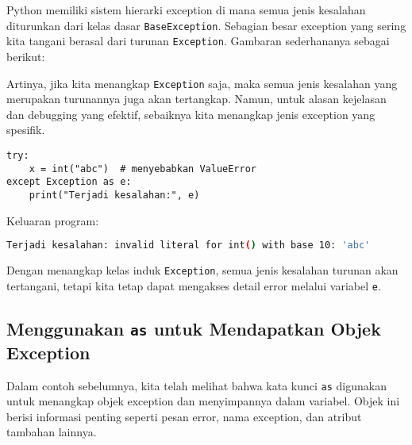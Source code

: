 Python memiliki sistem hierarki exception di mana semua jenis kesalahan diturunkan dari kelas dasar \texttt{BaseException}. Sebagian besar exception yang sering kita tangani berasal dari turunan \texttt{Exception}.  
Gambaran sederhananya sebagai berikut:

\begin{center}
\end{center}

Artinya, jika kita menangkap \texttt{Exception} saja, maka semua jenis kesalahan yang merupakan turunannya juga akan tertangkap. Namun, untuk alasan kejelasan dan debugging yang efektif, sebaiknya kita menangkap jenis exception yang spesifik.

\begin{lstlisting}[style=PythonStyle, caption={Menangkap seluruh exception menggunakan kelas induk}]
try:
    x = int("abc")  # menyebabkan ValueError
except Exception as e:
    print("Terjadi kesalahan:", e)
\end{lstlisting}

Keluaran program:

\begin{lstlisting}[language=bash]
Terjadi kesalahan: invalid literal for int() with base 10: 'abc'
\end{lstlisting}

Dengan menangkap kelas induk \texttt{Exception}, semua jenis kesalahan turunan akan tertangani, tetapi kita tetap dapat mengakses detail error melalui variabel \texttt{e}.

\subsection*{Menggunakan \texttt{as} untuk Mendapatkan Objek Exception}

Dalam contoh sebelumnya, kita telah melihat bahwa kata kunci \texttt{as} digunakan untuk menangkap objek exception dan menyimpannya dalam variabel. Objek ini berisi informasi penting seperti pesan error, nama exception, dan atribut tambahan lainnya.

